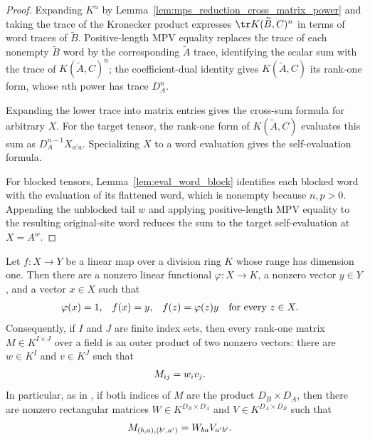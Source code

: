 \begin{proof}
    \leanok
    Expanding $K^n$ by Lemma~\ref{lem:mps_reduction_cross_matrix_power} and
    taking the trace of the Kronecker product expresses $\tr K(\widetilde B,C)^n$
    in terms of word traces of $\widetilde B$.  Positive-length MPV equality
    replaces the trace of each nonempty $\widetilde B$ word by the
    corresponding $\widetilde A$ trace, identifying the scalar sum with the
    trace of $K(\widetilde A,C)^n$; the coefficient-dual identity gives
    $K(\widetilde A,C)$ its rank-one form, whose $n$th power has trace
    $D_A^n$.

    Expanding the lower trace into matrix entries gives the cross-sum formula
    for arbitrary $X$.  For the target tensor, the rank-one form of
    $K(\widetilde A,C)$ evaluates this sum as $D_A^{n-1}X_{a'a}$.
    Specializing $X$ to a word evaluation gives the self-evaluation formula.

    For blocked tensors, Lemma~\ref{lem:eval_word_block} identifies each
    blocked word with the evaluation of its flattened word, which is nonempty
    because $n,p>0$.  Appending the unblocked tail $w$ and applying
    positive-length MPV equality to the resulting original-site word reduces
    the sum to the target self-evaluation at $X=A^w$.
\end{proof}

\begin{lemma}
    \label{thm:rank_one_factorizations}
    \leanok
    Let $f\colon X\to Y$ be a linear map over a division ring $K$ whose range
    has dimension one.  Then there are a nonzero linear functional
    $\varphi\colon X\to K$, a nonzero vector $y\in Y$, and a vector $x\in X$
    such that
    \begin{align}
        \varphi(x) & =1, & f(x) & =y, & f(z) & =\varphi(z)y
        \quad\text{for every }z\in X.
        \notag
    \end{align}
    Consequently, if $I$ and $J$ are finite index sets, then every rank-one
    matrix $M\in K^{I\times J}$ over a field is an outer product of two
    nonzero vectors: there are $w\in K^I$ and $v\in K^J$ such that
    \begin{align}
        M_{ij} & =w_i v_j.
        \notag
    \end{align}
    In particular, as in
    \cite[proof of Proposition~20, lines~3866--3936]{Molnar2018SemiInjective},
    if both indices of $M$ are the product $D_B\times D_A$, then there are
    nonzero rectangular matrices $W\in K^{D_B\times D_A}$ and
    $V\in K^{D_A\times D_B}$ such that
    \begin{align}
        M_{(b,a),(b',a')}
         & =W_{ba}V_{a'b'}.
        \notag
    \end{align}
\end{lemma}

